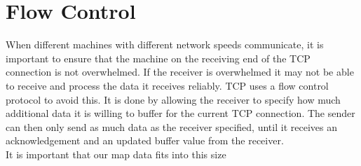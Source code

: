 \section{Flow Control}
When different machines with different network speeds communicate, it is important to ensure that the machine on the receiving end of the TCP connection is not overwhelmed. If the receiver is overwhelmed it may not be able to receive and process the data it receives reliably. TCP uses a flow control protocol to avoid this. It is done by allowing the receiver to specify how much additional data it is willing to buffer for the current TCP connection. The sender can then only send as much data as the receiver specified, until it receives an acknowledgement and an updated buffer value from the receiver.\\

It is important that our map data fits into this size